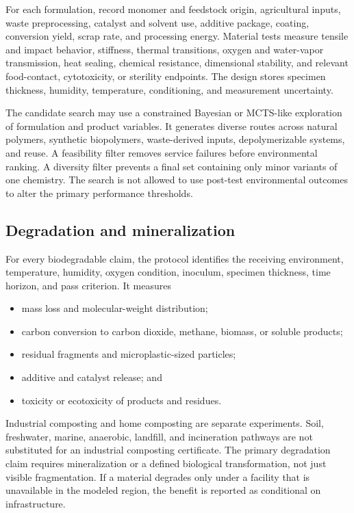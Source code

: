 \documentclass[conference]{IEEEtran}
\begin{document}
For each formulation, record monomer and feedstock origin, agricultural inputs, waste preprocessing, catalyst and solvent use, additive package, coating, conversion yield, scrap rate, and processing energy. Material tests measure tensile and impact behavior, stiffness, thermal transitions, oxygen and water-vapor transmission, heat sealing, chemical resistance, dimensional stability, and relevant food-contact, cytotoxicity, or sterility endpoints. The design stores specimen thickness, humidity, temperature, conditioning, and measurement uncertainty.

The candidate search may use a constrained Bayesian or MCTS-like exploration of formulation and product variables. It generates diverse routes across natural polymers, synthetic biopolymers, waste-derived inputs, depolymerizable systems, and reuse. A feasibility filter removes service failures before environmental ranking. A diversity filter prevents a final set containing only minor variants of one chemistry. The search is not allowed to use post-test environmental outcomes to alter the primary performance thresholds.

\subsection{Degradation and mineralization}

For every biodegradable claim, the protocol identifies the receiving environment, temperature, humidity, oxygen condition, inoculum, specimen thickness, time horizon, and pass criterion. It measures
\begin{itemize}
\item mass loss and molecular-weight distribution;
\item carbon conversion to carbon dioxide, methane, biomass, or soluble products;
\item residual fragments and microplastic-sized particles;
\item additive and catalyst release; and
\item toxicity or ecotoxicity of products and residues.
\end{itemize}

Industrial composting and home composting are separate experiments. Soil, freshwater, marine, anaerobic, landfill, and incineration pathways are not substituted for an industrial composting certificate. The primary degradation claim requires mineralization or a defined biological transformation, not just visible fragmentation. If a material degrades only under a facility that is unavailable in the modeled region, the benefit is reported as conditional on infrastructure.
\end{document}
